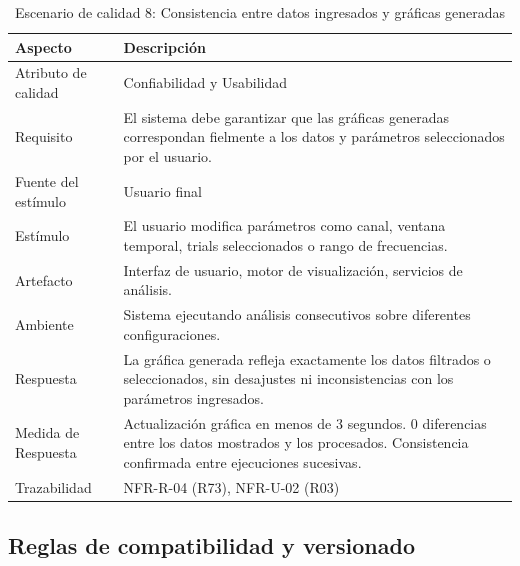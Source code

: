 \documentclass[11pt,a4paper]{article}
\DeclareRobustCommand{\_}{\textunderscore\allowbreak}
\begin{document}
\begin{table}[H]
\centering
\caption{Escenario de calidad 8: Consistencia entre datos ingresados y gráficas generadas}
\label{tab:escenario8}
\begin{tabularx}{\textwidth}{|l|X|}
\hline
\textbf{Aspecto} & \textbf{Descripción} \\
\hline
Atributo de calidad & Confiabilidad y Usabilidad \\
\hline
Requisito & El sistema debe garantizar que las gráficas generadas correspondan fielmente a los datos y parámetros seleccionados por el usuario. \\
\hline
Fuente del estímulo & Usuario final \\
\hline
Estímulo & El usuario modifica parámetros como canal, ventana temporal, trials seleccionados o rango de frecuencias. \\
\hline
Artefacto & Interfaz de usuario, motor de visualización, servicios de análisis. \\
\hline
Ambiente & Sistema ejecutando análisis consecutivos sobre diferentes configuraciones. \\
\hline
Respuesta & La gráfica generada refleja exactamente los datos filtrados o seleccionados, sin desajustes ni inconsistencias con los parámetros ingresados. \\
\hline
Medida de Respuesta & Actualización gráfica en menos de 3 segundos. 0 diferencias entre los datos mostrados y los procesados. Consistencia confirmada entre ejecuciones sucesivas. \\
\hline
Trazabilidad & NFR-R-04 (R73), NFR-U-02 (R03) \\
\hline
\end{tabularx}
\end{table}




\subsection{Reglas de compatibilidad y versionado}
\end{document}
